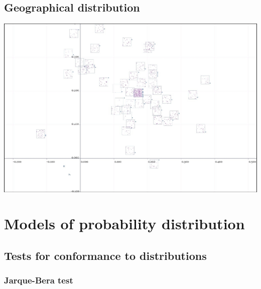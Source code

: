 \documentclass[10pt]{article}
\begin{document}
\subsection{Geographical distribution}
\includegraphics[width=170mm]{ReportMedia/GeographicalDistributionOfPopulation.jpg}

\newpage
\newpage
\section{Models of probability distribution}
\newpage
\subsection{Tests for conformance to distributions}
\newpage
\subsubsection{Jarque-Bera test}
\end{document}
